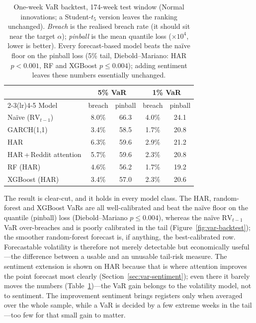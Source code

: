 \documentclass[12pt, a4paper]{article}
\begin{document}
\begin{table}[htbp]
    \centering
    \footnotesize
    \setlength{\tabcolsep}{6pt}
    \caption{One-week VaR backtest, 174-week test window (Normal innovations; a Student-\(t_5\)
    version leaves the ranking unchanged). \emph{Breach} is the realised breach rate (it should sit
    near the target \(\alpha\)); \emph{pinball} is the mean quantile loss (\(\times10^{4}\), lower is
    better). Every forecast-based model beats the na\"ive floor on the pinball loss (5\% tail,
    Diebold--Mariano: HAR \(p<0.001\), RF and XGBoost \(p\leq0.004\)); adding sentiment leaves
    these numbers essentially unchanged.}
    \label{tab:var-backtest}
    \begin{tabular}{l cc cc}
        \toprule
        & \multicolumn{2}{c}{5\% VaR} & \multicolumn{2}{c}{1\% VaR}\\
        \cmidrule(lr){2-3}\cmidrule(lr){4-5}
        Model & breach & pinball & breach & pinball\\
        \midrule
        Na\"ive (\(\mathrm{RV}_{t-1}\)) & 8.0\% & 66.3 & 4.0\% & 24.1\\
        GARCH(1,1)                      & 3.4\% & 58.5 & 1.7\% & 20.8\\
        HAR                             & 6.3\% & 59.6 & 2.9\% & 21.2\\
        HAR\,+\,Reddit attention        & 5.7\% & 59.6 & 2.3\% & 20.8\\
        RF (HAR)                        & 4.6\% & 56.2 & 1.7\% & 19.2\\
        XGBoost (HAR)                   & 3.4\% & 57.0 & 2.3\% & 20.6\\
        \bottomrule
    \end{tabular}
\end{table}

The result is clear-cut, and it holds in every model class. The HAR, random-forest and XGBoost
VaRs are all well-calibrated and beat the na\"ive floor on the quantile (pinball) loss
(Diebold--Mariano \(p\leq0.004\)), whereas the na\"ive \(\mathrm{RV}_{t-1}\) VaR over-breaches
and is poorly calibrated in the tail (Figure~\ref{fig:var-backtest}); the smoother random-forest
forecast is, if anything, the best-calibrated row. Forecastable volatility is therefore not
merely detectable but economically useful---the difference between a usable and an unusable
tail-risk measure. The sentiment extension is shown on HAR because that is where attention
improves the point forecast most clearly (Section~\ref{sec:var-sentiment}); even there it barely
moves the numbers (Table~\ref{tab:var-backtest})---the VaR gain belongs to the volatility model,
not to sentiment. The improvement sentiment brings registers only when averaged over the whole
sample, while a VaR is decided by a few extreme weeks in the tail---too few for that small gain
to matter.
\end{document}

